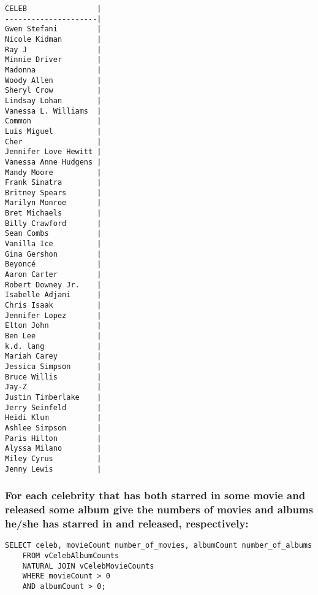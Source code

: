 \documentclass{article}
\begin{document}
        \begin{verbatim}
CELEB                |
---------------------|
Gwen Stefani         |
Nicole Kidman        |
Ray J                |
Minnie Driver        |
Madonna              |
Woody Allen          |
Sheryl Crow          |
Lindsay Lohan        |
Vanessa L. Williams  |
Common               |
Luis Miguel          |
Cher                 |
Jennifer Love Hewitt |
Vanessa Anne Hudgens |
Mandy Moore          |
Frank Sinatra        |
Britney Spears       |
Marilyn Monroe       |
Bret Michaels        |
Billy Crawford       |
Sean Combs           |
Vanilla Ice          |
Gina Gershon         |
Beyoncé              |
Aaron Carter         |
Robert Downey Jr.    |
Isabelle Adjani      |
Chris Isaak          |
Jennifer Lopez       |
Elton John           |
Ben Lee              |
k.d. lang            |
Mariah Carey         |
Jessica Simpson      |
Bruce Willis         |
Jay-Z                |
Justin Timberlake    |
Jerry Seinfeld       |
Heidi Klum           |
Ashlee Simpson       |
Paris Hilton         |
Alyssa Milano        |
Miley Cyrus          |
Jenny Lewis          |
        \end{verbatim}
        
        
        
        \subsubsection*{For each celebrity that has both starred in some movie and released some album give
the numbers of movies and albums he/she has starred in and released, respectively:}
        \begin{verbatim}
SELECT celeb, movieCount number_of_movies, albumCount number_of_albums
    FROM vCelebAlbumCounts
    NATURAL JOIN vCelebMovieCounts
    WHERE movieCount > 0
    AND albumCount > 0;\end{verbatim}
    
\end{document}
